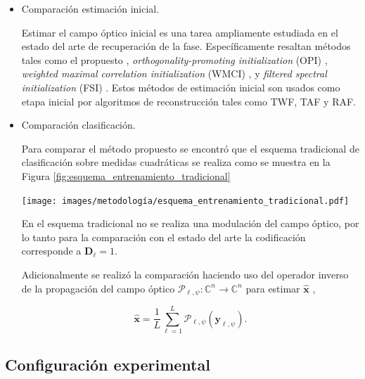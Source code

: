 \begin{itemize}
    \item Comparación estimación inicial.
    
    Estimar el campo óptico inicial es una tarea ampliamente estudiada en el estado del arte de recuperación de la fase. Específicamente resaltan métodos tales como el propuesto , \textit{orthogonality-promoting initialization} (OPI) , \textit{weighted maximal correlation initialization} (WMCI) , y \textit{filtered spectral initialization} (FSI) . Estos métodos de estimación inicial son usados como etapa inicial por algoritmos de reconstrucción tales como TWF, TAF y RAF.
    
    
    \item Comparación clasificación.
    
    Para comparar el método propuesto se encontró que el esquema tradicional de clasificación sobre medidas cuadráticas se realiza como se muestra en la Figura \ref{fig:esquema_entrenamiento_tradicional}
    
    \begin{minipage}[!h]{\linewidth}
      
      \texttt{[image: images/metodología/esquema\_entrenamiento\_tradicional.pdf]}
        \label{fig:esquema_entrenamiento_tradicional}
    \end{minipage}
    
    En el esquema tradicional no se realiza una modulación del campo óptico, por lo tanto para la comparación con el estado del arte la codificación corresponde a $\mathbf{D}_\ell = 1$.
    
    Adicionalmente se realizó la comparación haciendo uso del operador inverso de la propagación del campo óptico $\mathcal{P}_{\ell, \psi}:\mathbb{C}^n\rightarrow \mathbb{C}^n$ para estimar $\hat{\mathbf{x}}$ ,
    
    \begin{equation}
        \hat{\mathbf{x}}= \frac{1}{L}\sum_{\ell=1}^{ L} \mathcal{P}_{\ell, \psi}(\mathbf{y}_{\ell, \psi}).
        \label{eq:back_propagation}
    \end{equation}
\end{itemize}

\subsection{Configuración experimental}

